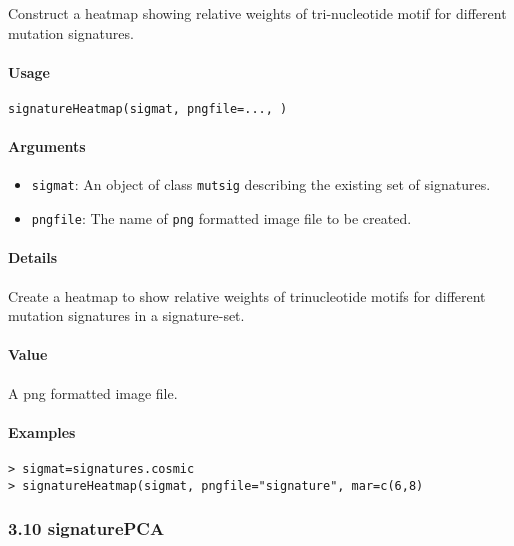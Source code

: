 \documentclass[]{article}
\providecommand{\tightlist}{%
  \setlength{\itemsep}{0pt}\setlength{\parskip}{0pt}}
\let\oldparagraph\paragraph
\renewcommand{\paragraph}[1]{\oldparagraph{#1}\mbox{}}
\begin{document}
Construct a heatmap showing relative weights of tri-nucleotide motif for
different mutation signatures.

\paragraph{\texorpdfstring{\textbf{Usage}}{Usage}}\label{usage-8}

\texttt{signatureHeatmap(sigmat,\ pngfile=...,\ )}

\paragraph{\texorpdfstring{\textbf{Arguments
}}{Arguments }}\label{arguments-7}

\begin{itemize}
\tightlist
\item
  \texttt{sigmat}: An object of class \texttt{mutsig} describing the
  existing set of signatures.
\item
  \texttt{pngfile}: The name of \texttt{png} formatted image file to be
  created.
\end{itemize}

\paragraph{\texorpdfstring{\textbf{Details}}{Details}}\label{details-5}

Create a heatmap to show relative weights of trinucleotide motifs for
different mutation signatures in a signature-set.

\paragraph{\texorpdfstring{\textbf{Value}}{Value}}\label{value-6}

A png formatted image file.

\paragraph{\texorpdfstring{\textbf{Examples}}{Examples}}\label{examples-8}

\begin{verbatim}
> sigmat=signatures.cosmic
> signatureHeatmap(sigmat, pngfile="signature", mar=c(6,8)
\end{verbatim}

\subsubsection{3.10 signaturePCA}\label{signaturepca}
\end{document}
